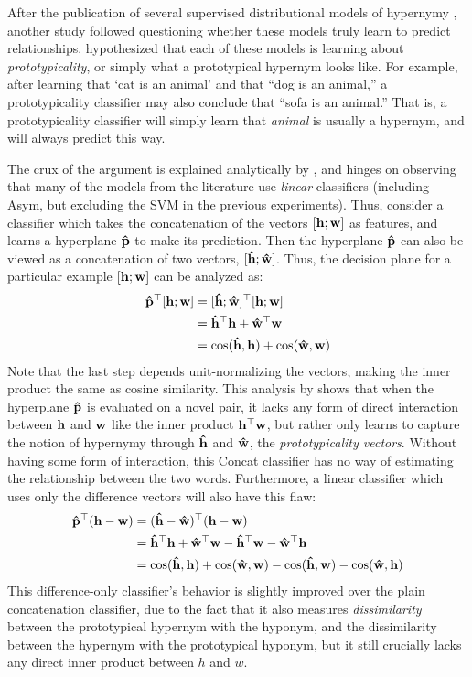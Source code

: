 After the publication of several supervised distributional models of hypernymy
\cite{baroni:2011:gems,fu:2014:acl,roller:2014:coling,weeds:2014:coling},
another study followed questioning whether these models truly learn to predict
relationships.  hypothesized that each of these models
is learning about {\em prototypicality}, or simply what a prototypical
hypernym looks like. For example, after learning that `cat is an animal'
and that ``dog is an animal,'' a prototypicality classifier may also conclude
that ``sofa is an animal.'' That is, a prototypicality classifier will
simply learn that {\em animal} is usually a hypernym, and will always
predict this way.

The crux of the argument is explained analytically by
, and hinges on observing that many of the models from
the literature use {\em linear} classifiers (including Asym, but excluding the
SVM in the previous experiments). Thus, consider a classifier which takes the
concatenation of the vectors $[{\mathbf{h}}; {\mathbf{w}}]$ as features, and learns a hyperplane
${\mathbf{\hat p}}$ to make its prediction. Then the hyperplane ${\mathbf{\hat p}}$ can also be
viewed as a concatenation of two vectors, $[{\mathbf{\hat h}}; {\mathbf{\hat w}}]$. Thus, the decision
plane for a particular example $[{\mathbf{h}}; {\mathbf{w}}]$ can be analyzed as:
\begin{align}
  \begin{split}
  {\mathbf{\hat p}}^\top [{\mathbf{h}}; {\mathbf{w}}] & = [{\mathbf{\hat h}}; {\mathbf{\hat w}}]^\top [{\mathbf{h}}; {\mathbf{w}}]\\
  & = {\mathbf{\hat h}}^\top{\mathbf{h}} + {\mathbf{\hat w}}^\top{\mathbf{w}}\\
  & = \mbox{cos}({\mathbf{\hat h}}, {\mathbf{h}}) + \mbox{cos}({\mathbf{\hat w}}, {\mathbf{w}})
  \end{split}
  \label{eqn:prototypicality}
\end{align}
Note that the last step depends unit-normalizing the vectors, making the inner
product the same as cosine similarity.  This
analysis by  shows that when the hyperplane ${\mathbf{\hat p}}$
is evaluated on a novel pair, it lacks any form of direct interaction between
${\mathbf{h}}$ and ${\mathbf{w}}$ like the inner product ${\mathbf{h}}^{\top}{\mathbf{w}}$, but rather only learns to
capture the notion of hypernymy through ${\mathbf{\hat h}}$ and ${\mathbf{\hat w}}$, the {\em
prototypicality vectors}.  Without having some form of interaction, this Concat
classifier has no way of estimating the relationship between the two words.
Furthermore, a linear classifier which uses only the difference vectors will
also have this flaw:
\begin{align*}
  {\mathbf{\hat p}}^{\top} ({\mathbf{h}} - {\mathbf{w}}) & = ({\mathbf{\hat h}} - {\mathbf{\hat w}})^{\top} ({\mathbf{h}} - {\mathbf{w}})\\
  & = {\mathbf{\hat h}}^{\top} {\mathbf{h}} + {\mathbf{\hat w}}^{\top} {\mathbf{w}} - {\mathbf{\hat h}}^{\top} {\mathbf{w}} - {\mathbf{\hat w}}^{\top} {\mathbf{h}}\\
  & = \mbox{cos}({\mathbf{\hat h}}, {\mathbf{h}}) + \mbox{cos}({\mathbf{\hat w}}, {\mathbf{w}}) - \mbox{cos}({\mathbf{\hat h}}, {\mathbf{w}}) - \mbox{cos}({\mathbf{\hat w}}, {\mathbf{h}})
\end{align*}
This difference-only classifier's behavior is slightly improved over the plain
concatenation classifier, due to the fact that it also measures {\em
dissimilarity} between the prototypical hypernym with the hyponym, and the
dissimilarity between the hypernym with the prototypical hyponym, but it still
crucially lacks any direct inner product between $h$ and $w$.

